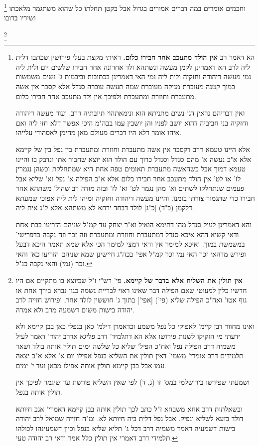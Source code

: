 \documentclass[12pt, openany]{book}
\newcommand{\footnotecomment}[1]{
	\renewcommand\thefootnote{}
	\footnote{#1}}
\newcommand{\commenta}[1]{\footnotecomment{#1}}
\begin{document}
{\commenta{ הא דאמר רב \textbf{אין הולד מתעכב אחר חבירו כלום.} ראיתי מקצת בעלי פירושין שכתבו דלית ליה לרב הא דאמרינן לקמן מעשה ונשתהא ולד אחרונה אחר חבירו שלשים יום ולית ליה נמי מעשה דיהודה וחזקיה ולית ליה נמי האי דאמרינן בכתובות וביבמות ג' נשים משמשות במוך קטנה מעוברת מניקה מעוברת שמה תעשה עוברה סנדל אלא קסבר אין אשה מתעברת וחוזרת ומתעברת ולפיכך אין ולד מתעכב אחר חבירו כלום.\par ואין דבריהם נראין דג' נשים מתניתא הוא ונימאתהוי תיובתיה דרב. ועוד מעשה דיהודה וחזקיה בני חביביה דהוא יושב לפניו והן יושבין עמו בבה"מ היכי אפשר דלא חזי ליה ואם איהו אומר דלא היו דברים מעולם מאן מהימן לאסהודי עלייהו.\par אלא היינו טעמא דרב דקסבר אין אשה מתעברת וחוזרת ומתעברת בין נפל בין של קיימא אלא א"כ נעשה א' מהם סנדל וסנדל כרוך עם הולד הוא יוצא שחבור אתו ונדבק בו והיינו טעמא דמוך אבל כשהאשה מתעברת תאומים טפה אחת היא שמתחלקת וכשהן נגמרין לז' או לט' אין הולד מתעכב אחר חבירו כלום אלא א"כ הפילה א' נפל וא' שליא אבל פעמים שנתחלקו לשתים וא' מהן נגמר לט' וא' לז' ובזה מודה רב שהול' משתהא אחר חבירו כדי שתגמור צורתו בזמנו. והיינו מעשה דיהודה וחזקיה ומיהו לית ליה אפוכי שמעתא דלקמן (כ"ד) [כ"ג] לולד דבחד ירחא לא משתהא אלא ל"ג אית ליה.\par והא דאמרינן לעיל סנדל מהו דתימא הואיל וא"ר יצחק עד קמ"ל שניהם הזריעו בבת אחת ודאי קשיא דהא איכא סנדל דמתעברת וחוזרת ומתעברת וזה זכר וזה נקבה כדפרישי' במשמשת במוך. ואיכא למימר אין ודאי דמצי למימר הכי אלא שמא תאמר היכא דבעל ופירש מדהאי זכר האי נמי זכר קמ"ל אפי' בכה"ג חיישינן שמא שניהם הזריעו כא' והאי זכר (נמי) והאי נקבה כנ"ל. }
וחכמים אומרים במה דברים אמורים בגדול אבל בקטן תחלתו כל שהוא משתגמר מלאכתו ושיריו ברובו 
\commenta{\textbf{אין תולין את השליח אלא בדבר של קיימא.} פי' רש"י ז"ל שכיוצא בו מתקיים אם היו חדשיו כלין למעוטי שאם הפילה דבר שאינו ראוי לבריית נשמה כגון נברא בירך אחת או גוף אטו' ואח"כ הפילה שליא (פי') [אפי'] בתוך ג' חוששין לולד אחר, ופירוש חזייה לרב יהודה בישות משום דשמעה מרב ולא אמרה.\par ואינו מחוור דבן קיימ' לאפוקי כל נפל משמע וכדאמרן דילמ' כאן בנפלי כאן בבן קיימא ולא ידעתי מי הזקיקו לשנות פירושו אלא הא דתלמיד' דרב פליגא אדרב יהוד' דאמר לעיל משמיה דרב הפילה נפל ואח"כ הפיל' שליא כל שלשה ימים תולין אותה בולד ושאר תלמידים דרב אומרי' משמי' דאין תולין את השליא בנפל אפילו יום א' אלא א"כ יצאה עמו אבל בבן קיימא תולין אותה אפילו מכאן ועד י' ימים.\par ושמעתי שפירשו בירושלמי במס' זו (ג, ד) לפי שאין השליא פורשת עד שיגמר לפיכך אין תולין אותה בנפל.\par ובשאלתות דרב אחא משבחא ז"ל כתב לכך תולין אותה בבן קיימא דאמרי' אגב חיותא דולד בזעא לשליא ונפיק. אבל נפל דלית ביה חיותא לא. ומ"ה חזייה שמואל לרב יהודה בישות דשמעיה דאמר משמיה דרב דכל ג' תליא שליא בנפל וכיון דשמעינהו לכולהו תלמידי דרב דאמרי אין תולין כלל אמר ודאי רב יהודה טעי. }
}
\end{document}
